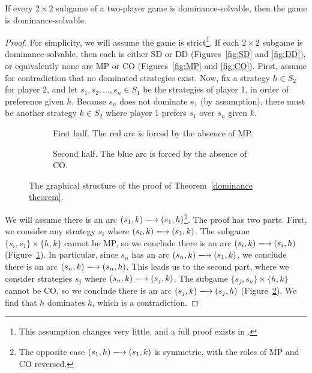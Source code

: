 \documentclass[preprint,authoryear]{elsarticle}
\begin{document}
\begin{thm} \label{dominance theorem}
   If every $2\times 2$ subgame of a two-player game is dominance-solvable, then the game is dominance-solvable.
\end{thm}
\begin{proof}
    For simplicity, we will assume the game is strict\footnote{This assumption changes very little, and a full proof exists in \cite{biggar_graph_2023}.}. If each $2\times 2$ subgame is dominance-solvable, then each is either SD or DD (Figures~\ref{fig:SD} and \ref{fig:DD}), or equivalently none are MP or CO (Figures~\ref{fig:MP} and \ref{fig:CO}). First, assume for contradiction that no dominated strategies exist. Now, fix a strategy $h \in S_2$ for player 2, and let $s_1,s_2,\dots,s_n \in S_1$ be the strategies of player 1, in order of preference given $h$. Because $s_n$ does not dominate $s_1$ (by assumption), there must be another strategy $k\in S_2$ where player 1 prefers $s_1$ over $s_n$ given $k$.
    \begin{figure}
    \centering
        \begin{subfigure}{\textwidth}
            \centering
            
            \caption{First half. The red arc is forced by the absence of MP.}
            \label{fig:dominance 2}
        \end{subfigure}
        \begin{subfigure}{\textwidth}
            \centering
            
            \caption{Second half. The blue arc is forced by the absence of CO.}
            \label{fig:dominance 3}
        \end{subfigure}
        \caption{The graphical structure of the proof of Theorem~\ref{dominance theorem}.}
        \label{fig:dominance proof}
    \end{figure}
    
    We will assume there is an arc $\arc{(s_1,k)}{(s_1,h)}$\footnote{The opposite case $\arc{(s_1,h)}{(s_1,k)}$ is symmetric, with the roles of MP and CO reversed.}. The proof has two parts. First, we consider any strategy $s_i$ where $\arc{(s_i,k)}{(s_1,k)}$. The subgame $\{s_i,s_1\}\times \{h,k\}$ cannot be MP, so we conclude there is an arc $\arc{(s_i,k)}{(s_i,h)}$ (Figure~\ref{fig:dominance 2}). In particular, since $s_n$ has an arc $\arc{(s_n,k)}{(s_1,k)}$, we conclude there is an arc $\arc{(s_n,k)}{(s_n,h)}$. This leads us to the second part, where we consider strategies $s_j$ where $\arc{(s_n,k)}{(s_j,k)}$. The subgame $\{s_j,s_n\}\times \{h,k\}$ cannot be CO, so we conclude there is an arc $\arc{(s_j,k)}{(s_j,h)}$ (Figure~\ref{fig:dominance 3}). We find that $h$ dominates $k$, which is a contradiction.
\end{proof}
\end{document}
